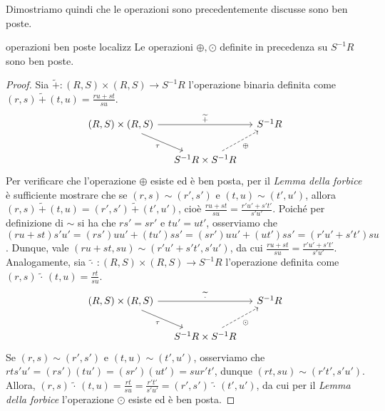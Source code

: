 \vspace{2mm}
\noindent Dimostriamo quindi che le operazioni sono precedentemente discusse sono ben poste.

\clearpage


\begin{lem}[]{operazioni ben poste localizz}
Le operazioni $\oplus, \odot$ definite in precedenza su $S^{-1}R$ sono ben poste.
\end{lem}
\begin{proof}
  \noindent Sia $\widetilde{+}\colon (R,S)\times (R,S)\to S^{-1}R$ l'operazione binaria definita come $(r,s)\,\widetilde{+}\,(t,u)=\frac{ru+st}{su}$.
  \[
    \begin{tikzcd}[column sep=small]
  {(R,S)\times(R,S)} \arrow[rd, "\tau"'] \arrow[rr, "\widetilde{+}"] &                                                     & S^{-1}R \\
                                                                    & S^{-1}R\times S^{-1}R \arrow[ru, "\oplus"', dashed] &        
  \end{tikzcd}
  \]
  Per verificare che l'operazione $\oplus$ esiste ed è ben posta, per il \emph{Lemma della forbice} è sufficiente mostrare che se 
  $(r,s)\sim (r',s')$ e $(t,u)\sim (t',u')$, allora $(r,s)\,\widetilde{+}\,(t,u)=(r',s')\,\widetilde{+}\,(t',u')$, 
  cioè $\frac{ru+st}{su}=\frac{r'u'+s't'}{s'u'}$. Poiché per definizione di $\sim$ si ha che $rs'=sr'$ e $tu'=ut'$, 
  osserviamo che $(ru+st)s'u'=(rs')uu'+(tu')ss'=(sr')uu'+(ut')ss'=(r'u'+s't')su$. 
  Dunque, vale $(ru+st,su)\sim (r'u'+s't',s'u')$, da cui $\frac{ru+st}{su}=\frac{r'u'+s't'}{s'u'}$.
  \noindent Analogamente, sia $\widetilde{\cdot}\,\colon (R,S)\times (R,S)\to S^{-1}R$ l'operazione definita come 
  $(r,s)\,\widetilde{\cdot}\,(t,u)=\frac{rt}{su}$.
  \[
    \begin{tikzcd}[column sep=small]
  {(R,S)\times(R,S)} \arrow[rd, "\tau"'] \arrow[rr, "\widetilde{\cdot}"] &                                                    & S^{-1}R \\
                                                                        & S^{-1}R\times S^{-1}R \arrow[ru, "\odot"', dashed] &        
  \end{tikzcd}
  \]
  Se $(r,s)\sim (r',s')$ e $(t,u)\sim (t',u')$, osserviamo che $rts'u'=(rs')(tu')=(sr')(ut')=sur't'$, dunque $(rt,su)\sim(r't',s'u')$. 
  Allora, $(r,s)\,\widetilde{\cdot}\,(t,u)=\frac{rt}{su}=\frac{r't'}{s'u'}=(r',s')\,\widetilde{\cdot}\,(t',u')$, da cui per il 
  \emph{Lemma della forbice} l'operazione $\odot$ esiste ed è ben posta.
\end{proof}

